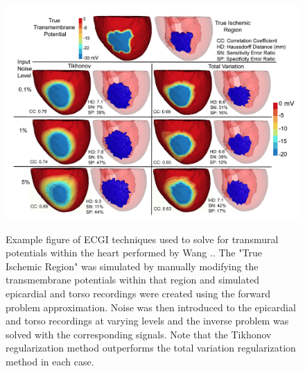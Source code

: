 
\begin{figure}[htb]%
	\begin{center}
		{\includegraphics[width=\textwidth]
			{../Figures/wangECGI.png}}
		\captionsetup{width = \textwidth}
		\caption{\small \label{fig:wang} Example figure of ECGI techniques used to solve for transmural potentials within the heart performed by Wang \etal.\cite{RSM:Wan2013}. The "True Ischemic Region" was simulated by manually modifying the transmembrane potentials within that region and simulated epicardial and torso recordings were created using the forward problem approximation. Noise was then introduced to the epicardial and torso recordings at varying levels and the inverse problem was solved with the corresponding signals. Note that the Tikhonov regularization method outperforms the total variation regularization method in each case. }
	\end{center}
\end{figure}

